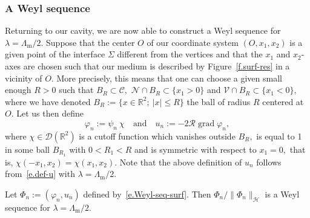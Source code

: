 \documentclass[AHL,Unicode,longabstracts]{cedram}
\DeclareMathOperator{\grad}{grad}
\newcommand{\calC}{\mathcal{C}}
\newcommand{\calD}{\mathcal{D}}
\newcommand{\calH}{\mathcal{H}}
\newcommand{\calN}{\mathcal{N}}
\newcommand{\calR}{\mathcal{R}}
\newcommand{\calV}{\mathcal{V}}
\newcommand{\bbR}{\mathbb{R}}
\newcommand{\Lm}{{\Lambda_{\mathrm{m}}}}
\begin{document}
\subsubsection{A Weyl sequence}
Returning to our cavity, we are now able to construct a Weyl sequence for\linebreak$\lambda = \Lm/2$. Suppose that the center $O$ of our coordinate system $(O,x_1,x_2)$ is a given point of the interface $\Sigma$ different from the vertices and that the $x_1$ and $x_2$-axes are chosen such that our medium is described by Figure~\ref{f.surf-res} in a vicinity of $O.$ More precisely, this means that one can choose a given small enough $R>0$ such that $B_R \subset \calC,$ $\calN \cap B_R \subset \{x_1 > 0\}$ and $\calV \cap B_R \subset \{x_1 < 0\},$ where we have denoted $B_R := \{ x \in \bbR^2;\ |x| \le R \}$ the ball of radius $R$ centered at $O.$ Let us then define
\begin{equation}\label{e.Weyl-seq-surf}
\varphi_n := \psi_n \ \chi
\quad\text{and}\quad u_n := -2 \calR \grad \varphi_n,
\end{equation}
where $\chi \in \calD(\bbR^2)$ is a cutoff function which vanishes outside $B_R,$ is equal to 1 in some ball $B_{R_1}$ with $0 < R_1 < R$ and is symmetric with respect to $x_1=0,$ that is, $\chi(-x_1,x_2) = \chi(x_1,x_2).$ Note that the above definition of $u_n$ follows from~\eqref{e.def-u} with $\lambda=\Lm/2$.

\begin{prop}\label{p-Weyl-surface}
Let $\Phi_n := (\varphi_n,u_n)$ defined by~\eqref{e.Weyl-seq-surf}. Then $\Phi_n/\|\Phi_n\|_\calH$ is a Weyl sequence for $\lambda = \Lm/2$.
\end{prop}
\end{document}
